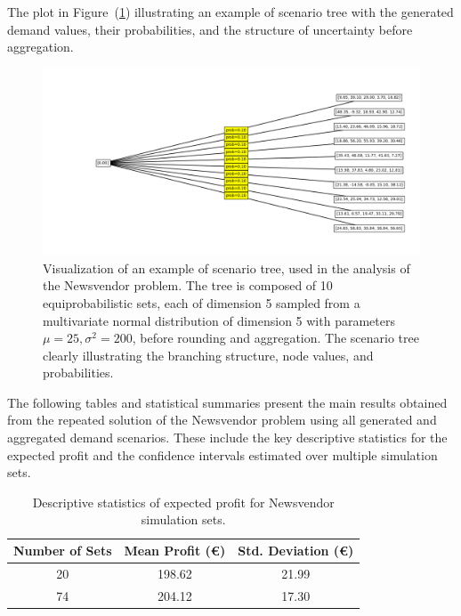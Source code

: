 \documentclass[a4paper,12pt]{article}
\begin{document}
	
	\noindent The plot in Figure~(\ref{fig:scenariotree-plot}) illustrating an example of scenario tree  with the generated demand values, their probabilities, and the structure of uncertainty before aggregation.
	\begin{figure}[H]
		\includegraphics[width=1\textwidth]{../immagini/scenariNV.png}
		\caption{Visualization of an example of scenario tree, used in the analysis of the Newsvendor problem. The tree is composed of 10 equiprobabilistic sets, each of dimension 5 sampled from a multivariate normal distribution of dimension 5 with parameters $\mu = 25, \sigma^{2} = 200$, before rounding and aggregation. The scenario tree clearly illustrating the branching structure, node values, and probabilities. }
		\label{fig:scenariotree-plot}
	\end{figure}
	
	\noindent
	The following tables and statistical summaries present the main results obtained from the repeated solution of the Newsvendor problem using all generated and aggregated demand scenarios. These include the key descriptive statistics for the expected profit and the confidence intervals estimated over multiple simulation sets.
	
	\begin{table}[htbp]
		\centering
		\caption{Descriptive statistics of expected profit for Newsvendor simulation sets.}
		\begin{tabular}{|c|c|c|}
			\hline
			\textbf{Number of Sets} & \textbf{Mean Profit (€)} & \textbf{Std. Deviation (€)} \\
			\hline
			20 & 198.62 & 21.99 \\
			74 & 204.12 & 17.30 \\
			\hline
		\end{tabular}
		\label{tab:profit-descriptive}
	\end{table}
	
\end{document}
